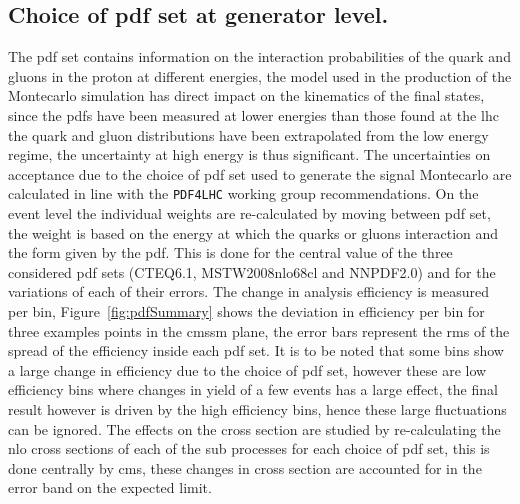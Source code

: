\subsection{Choice of \ac{pdf} set at generator level.} %
\label{sub:choice_of_pdf_set_at_generator_level_}
The \ac{pdf} set contains information on the interaction probabilities of the 
quark and gluons in the proton at different energies, the model used in the 
production of the Montecarlo simulation has direct impact on the kinematics of 
the final states, since the \ac{pdf}s have been measured at lower energies than 
those found at the \ac{lhc} the quark and gluon distributions have been 
extrapolated from the low energy regime, the uncertainty at high energy is thus 
significant.
The uncertainties on acceptance due to the choice of \ac{pdf} set used to 
generate the signal Montecarlo are calculated in line with the 
\texttt{PDF4LHC}\cite{pdf4lhc} working group recommendations. On the event 
level the individual weights are re-calculated by moving between \ac{pdf} set, 
the weight is based on the energy at which the quarks or gluons interaction and 
the form given by the \ac{pdf}. This is done for the central value of the three 
considered \ac{pdf} sets (CTEQ6.1\cite{cteq6.1}, MSTW2008nlo68cl\cite{MSTW} and 
NNPDF2.0\cite{NNPDF}) and for the variations of each of their errors. The 
change in analysis efficiency is measured per \HT bin, 
Figure~\ref{fig:pdfSummary} shows the deviation in efficiency per bin for three 
examples points in the \ac{cmssm} plane, the error bars represent the \ac{rms} 
of the spread of the efficiency inside each \ac{pdf} set. It is to be noted 
that some bins show a large change in efficiency due to the choice of \ac{pdf} 
set, however these are low efficiency bins where changes in yield of a few 
events has a large effect, the final result however is driven by the high 
efficiency bins, hence these large fluctuations can be ignored. The effects on 
the cross section are studied by re-calculating the \ac{nlo} cross sections of 
each of the sub processes for each choice of \ac{pdf} set, this is done 
centrally by \ac{cms}, these changes in cross section are accounted for in the 
error band on the expected limit.

